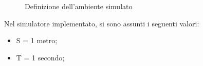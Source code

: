 \begin{figure}[H] 
    \begin{center}
    \end{center}
    \caption{Definizione dell'ambiente simulato}
    \label{elementi_ambiente}
\end{figure}



Nel simulatore implementato, si sono assunti i seguenti valori:
\begin{itemize}
    \item S = 1 metro;
    \item T = 1 secondo; 
\end{itemize}